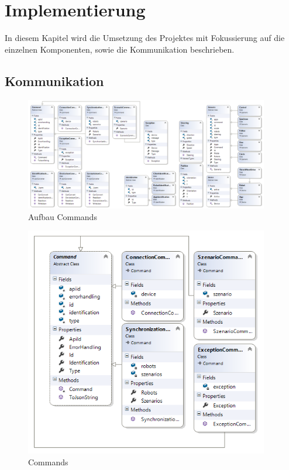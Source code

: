 \section{Implementierung}

In diesem Kapitel wird die Umsetzung des Projektes mit Fokussierung auf die einzelnen Komponenten, sowie die Kommunikation beschrieben.

\subsection{Kommunikation}

\begin{figure}[h]
	\begin{center}
		\includegraphics[width=0.95\textwidth]{images/uml/full_class_diagram.png}
	\end{center}
	\caption{Aufbau Commands}
	\label{fig:full_classdiagram}
\end{figure}

\begin{figure}[h]
	\begin{center}
		\includegraphics[width=0.95\textwidth]{images/uml/commands.png}
	\end{center}
	\caption{Commands}
	\label{fig:commands_classdiagram}
\end{figure}

